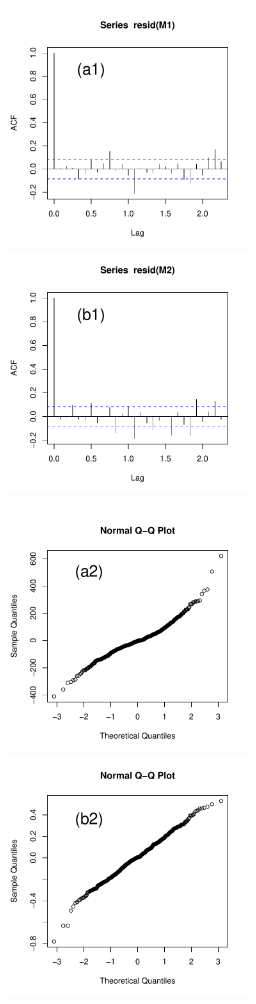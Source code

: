 \documentclass[11pt]{article}
\begin{document}
\begin{figure}[h]\vspace{-0.5cm}
\includegraphics[width=3in,height=2.5in]{m1-resid}
\hfill\includegraphics[width=3in,height=2.5in]{m2-resid}

\includegraphics[width=3in,height=2.5in]{m1-qq}
\hfill\includegraphics[width=3in,height=2.5in]{m2-qq}


\end{figure}
\end{document}
